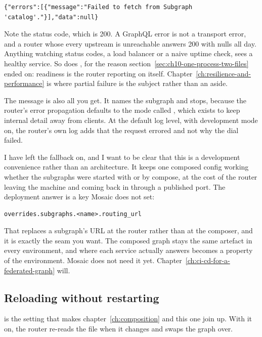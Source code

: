 \begin{verbatim}
{"errors":[{"message":"Failed to fetch from Subgraph 'catalog'."}],"data":null}
\end{verbatim}

%
Note the status code, which is 200. A GraphQL error is not a transport error,
and a router whose every upstream is unreachable answers 200 with nulls all
day. Anything watching status codes, a load balancer or a naive uptime check,
sees a healthy service. So does , for the reason
section~\ref{sec:ch10-one-process-two-files} ended on: readiness is the router
reporting on itself. Chapter~\ref{ch:resilience-and-performance} is where
partial failure is the subject rather than an aside.

The message is also all you get. It names the subgraph and stops, because the
router's error propagation defaults to the mode called , which
exists to keep internal detail away from clients. At the default log level, with
development mode on, the router's own log adds that the request errored and not
why the dial failed.

%
I have left the fallback on, and I want to be clear that this is a development
convenience rather than an architecture. It keeps one composed config working
whether the subgraphs were started with  or by compose, at the
cost of the router leaving the machine and coming back in through a published
port. The deployment answer is a key Mosaic does not set:

\begin{verbatim}
overrides.subgraphs.<name>.routing_url
\end{verbatim}

That replaces a subgraph's URL at the router rather than at the composer, and
it is exactly the seam you want. The composed graph stays the same artefact in
every environment, and where each service actually answers becomes a property
of the environment. Mosaic does not need it yet.
Chapter~\ref{ch:ci-cd-for-a-federated-graph} will.

\subsection*{Reloading without restarting}

%
 is the setting that makes
chapter~\ref{ch:composition} and this one join up. With it on, the router
re-reads the file when it changes and swaps the graph over.

